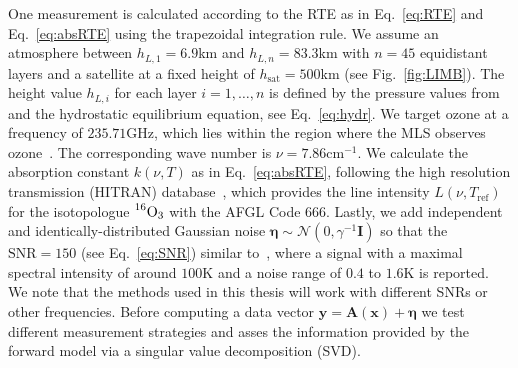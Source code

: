 One measurement is calculated according to the RTE as in Eq.~\ref{eq:RTE} and Eq.~\ref{eq:absRTE} using the trapezoidal integration rule.
We assume an atmosphere between $h_{L,1} = 6.9$km and $h_{L,n} = 83.3$km with $n = 45$ equidistant layers and a satellite at a fixed height of $h_{\text{sat}} = 500$km (see Fig.~\ref{fig:LIMB}).
The height value $h_{L,i}$ for each layer $i = 1,\dots, n$ is defined by the pressure values from~\cite{MLSdata} and the hydrostatic equilibrium equation, see Eq.~\ref{eq:hydr}.
We target ozone at a frequency of $235.71$GHz, which lies within the region where the MLS observes ozone~\cite{livesey2008ozonecarbonmono, waters2006earth}.
The corresponding wave number is $\nu = 7.86\text{cm}^{-1}$.
We calculate the absorption constant $k(\nu,T)$ as in Eq.~\ref{eq:absRTE}, following the high resolution transmission (HITRAN) database~\cite{gordon2022hitran2020}, which provides the line intensity $L(\nu,T_{\text{ref}})$ for the isotopologue $\prescript{16}{}{\text{O}}_3$ with the AFGL Code 666.
Lastly, we add independent and identically-distributed Gaussian noise $\bm{\eta} \sim \mathcal{N}(0,\gamma^{-1} \bm{I})$ so that the $\text{SNR}=150$ (see Eq.~\ref{eq:SNR}) similar to~\cite{Froidevaux2008snrozone}, where a signal with a maximal spectral intensity of around $100\text{K}$ and a noise range of $0.4$ to $1.6\text{K}$ is reported.
We note that the methods used in this thesis will work with different SNRs or other frequencies.
Before computing a data vector $\bm{y} = \bm{A}(\bm{x}) + \bm{\eta} $ we test different measurement strategies and asses the information provided by the forward model via a singular value decomposition (SVD).

